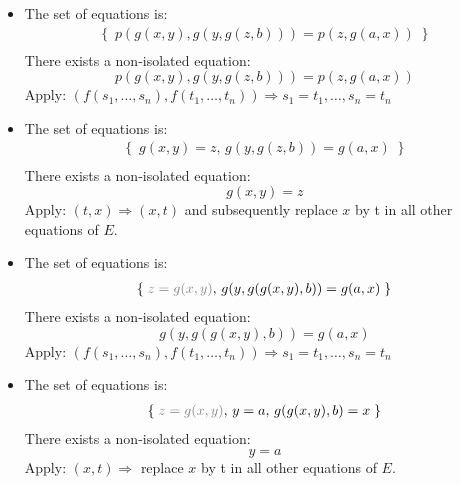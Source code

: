 \documentclass[11pt,a4paper]{article}
\begin{document}
\begin{itemize}
\item The set of equations is:
\begin{equation*}
\begin{split}
\left\lbrace  \; p(g(x, y), g(y, g(z, b))) =p(z, g(a, x))  \; \right\rbrace  \\
\end{split}
\end{equation*}
There exists a non-isolated equation: 
\begin{equation*}
p(g(x, y), g(y, g(z, b))) =p(z, g(a, x)) 
\end{equation*}
Apply: $(f (s_1 , \dots , s_n ), f (t_1 , \dots , t_n )) \Rightarrow s_1 = t_1 , \dots , s_n = t_n$

\item The set of equations is:
\begin{equation*}
\begin{split}
\left\lbrace  \; g(x, y) = z, \, g(y, g(z, b)) = g(a,x) \; \right\rbrace  \\
\end{split}
\end{equation*}
There exists a non-isolated equation: 
\begin{equation*}
g(x, y) = z
\end{equation*}
Apply: $(t, x) \Rightarrow (x,t)$ and subsequently replace $x$ by t in all other equations of $E$.

\item The set of equations is:
\begin{equation*}
\begin{split}
\left\lbrace  \; \textcolor{gray}{z = g(x, y)}, \, g(y, g(g(x, y), b)) = g(a,x)  \; \right\rbrace  \\
\end{split}
\end{equation*}
There exists a non-isolated equation: 
\begin{equation*}
g(y, g(g(x, y), b)) = g(a,x)
\end{equation*}
Apply: $(f (s_1 , \dots , s_n ), f (t_1 , \dots , t_n )) \Rightarrow s_1 = t_1 , \dots , s_n = t_n$

 \item The set of equations is:
\begin{equation*}
\begin{split}
\left\lbrace  \; \textcolor{gray}{z = g(x, y)},\,  y=a,\, g(g(x,y), b)=x \; \right\rbrace  \\
\end{split}
\end{equation*}
There exists a non-isolated equation: 
\begin{equation*}
y=a
\end{equation*}
Apply: $(x, t) \Rightarrow $ replace $x$ by t in all other equations of $E$.


\end{itemize}
\end{document}
